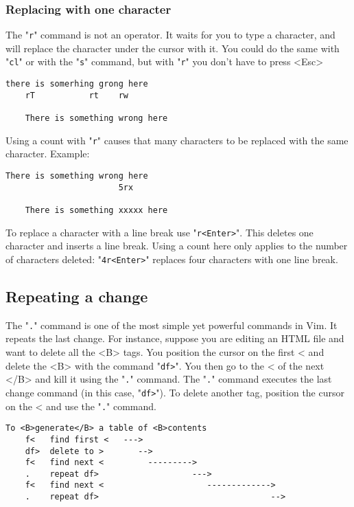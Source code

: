 \subsubsection{Replacing with one character}

The "\texttt{r}" command is not an operator.
It waits for you to type a character, and will replace the character under the cursor with it.
You could do the same with "\texttt{cl}" or with the "\texttt{s}" command, but with "\texttt{r}" you don't have to press <Esc>

\begin{Verbatim}[samepage=true]
    there is somerhing grong here 
    rT           rt    rw

    There is something wrong here 
\end{Verbatim}

Using a count with "\texttt{r}" causes that many characters to be replaced with the same character.
Example:

\begin{Verbatim}[samepage=true]
    There is something wrong here 
                       5rx

    There is something xxxxx here 
\end{Verbatim}

To replace a character with a line break use "\texttt{r<Enter>}".
This deletes one character and inserts a line break.
Using a count here only applies to the number of characters deleted: "\texttt{4r<Enter>}" replaces four characters with one line break.

\subsection{Repeating a change}

The "\texttt{.}" command is one of the most simple yet powerful commands in Vim.
It repeats the last change.
For instance, suppose you are editing an HTML file and want to delete all the <B> tags.
You position the cursor on the first < and delete the <B> with the command "\texttt{df>}".
You then go to the < of the next </B> and kill it using the "\texttt{.}" command.
The "\texttt{.}" command executes the last change command (in this case, "\texttt{df>}").
To delete another tag, position the cursor on the < and use the "\texttt{.}" command.

\begin{Verbatim}[samepage=true]
                        To <B>generate</B> a table of <B>contents 
    f<   find first <   --->
    df>  delete to >       -->
    f<   find next <         --------->
    .    repeat df>                   --->
    f<   find next <                     ------------->
    .    repeat df>                                   -->
\end{Verbatim}

